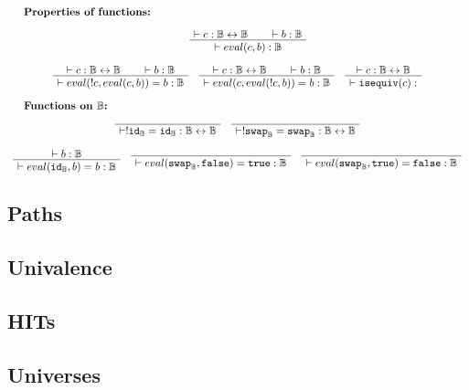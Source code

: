 \documentclass[format=acmlarge,review,natbib]{acmart}
\newcommand{\invc}[1]{!#1}
\newcommand{\evalone}[2]{eval(#1,#2)}
\newcommand{\isequiv}[1]{\mathtt{isequiv}(#1)}
\newcommand{\idc}{\mathtt{id}}
\newcommand{\swapc}{\mathtt{swap}}
\newcommand{\iso}{\leftrightarrow}
\newcommand{\fc}{\mathtt{false}}
\newcommand{\tc}{\mathtt{true}}
\newcommand{\boolt}{\mathbb{B}}
\newcommand{\proves}{\vdash}
\newcommand{\jdg}[3]{#1 \proves #2 : #3}
\begin{document}
\[\begin{array}{c}
    \noalign{\textbf{Properties of functions:}} \\
    \quad
    \quad
    \AxiomC{$\jdg{}{c}{\boolt\iso\boolt}$}
    \AxiomC{$\jdg{}{b}{\boolt}$}
    \BinaryInfC{$\jdg{}{\evalone{c}{b}}{\boolt}$}
    \DisplayProof
    \\
    \\
    \AxiomC{$\jdg{}{c}{\boolt\iso\boolt}$}
    \AxiomC{$\jdg{}{b}{\boolt}$}
    \BinaryInfC{$\jdg{}{\evalone{\invc{c}}{\evalone{c}{b}} = b}{\boolt}$}
    \DisplayProof
    \quad
    \AxiomC{$\jdg{}{c}{\boolt\iso\boolt}$}
    \AxiomC{$\jdg{}{b}{\boolt}$}
    \BinaryInfC{$\jdg{}{\evalone{c}{\evalone{\invc{c}}{b}} = b}{\boolt}$}
    \DisplayProof
    \quad
    \AxiomC{$\jdg{}{c}{\boolt\iso\boolt}$}
    \UnaryInfC{$\jdg{}{\isequiv{c}}{}$}
    \DisplayProof
    \\
    \\
    \noalign{\textbf{Functions on $\boolt$:}} \\
    \AxiomC{}
    \UnaryInfC{$\jdg{}{\invc{\idc_{\boolt} = \idc_{\boolt}}}{\boolt\iso\boolt}$}
    \DisplayProof
    \quad
    \AxiomC{}
    \UnaryInfC{$\jdg{}{\invc{\swapc _{\boolt}} = \swapc _{\boolt}}{\boolt\iso\boolt}$}
    \DisplayProof
    \\
    \\
    \AxiomC{$\jdg{}{b}{\boolt}$}
    \UnaryInfC{$\jdg{}{\evalone{\idc_{\boolt}}{b} = b}{\boolt}$}
    \DisplayProof
    \quad
    \AxiomC{}
    \UnaryInfC{$\jdg{}{\evalone{\swapc_{\boolt}}{\fc} = \tc}{\boolt}$}
    \DisplayProof
    \quad
    \AxiomC{}
    \UnaryInfC{$\jdg{}{\evalone{\swapc_{\boolt}}{\tc} = \fc}{\boolt}$}
    \DisplayProof
\end{array}\]

\subsection{Paths}

\subsection{Univalence}

\subsection{HITs}

\newpage

\subsection{Universes}
\end{document}
